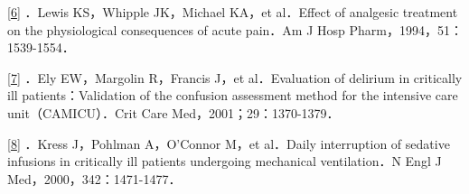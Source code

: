 \protect\hyperlink{text00027.htmlux5cux23ch6-26-back}{{[}6{]}} ．Lewis
KS，Whipple JK，Michael KA，et al．Effect of analgesic treatment on the
physiological consequences of acute pain．Am J Hosp
Pharm，1994，51：1539-1554．

\protect\hyperlink{text00027.htmlux5cux23ch7-26-back}{{[}7{]}} ．Ely
EW，Margolin R，Francis J，et al．Evaluation of delirium in critically
ill patients：Validation of the confusion assessment method for the
intensive care unit（CAMICU）．Crit Care Med，2001；29：1370-1379．

\protect\hyperlink{text00027.htmlux5cux23ch8-26-back}{{[}8{]}} ．Kress
J，Pohlman A，O'Connor M，et al．Daily interruption of sedative
infusions in critically ill patients undergoing mechanical
ventilation．N Engl J Med，2000，342：1471-1477．

\protect\hypertarget{text00028.html}{}{}

